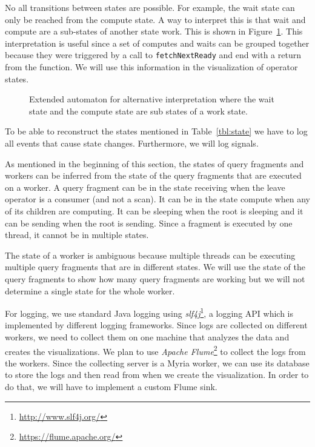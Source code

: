 \documentclass[11pt]{article}
\begin{document}
No all transitions between states are possible. For example, the wait state can only be reached from the compute state. A way to interpret this is that wait and compute are a sub-states of another state work. This is shown in Figure~\ref{fig:extd_compute}. This interpretation is useful since a set of computes and waits can be grouped together because they were triggered by a call to \texttt{fetchNextReady} and end with a return from the function. We will use this information in the visualization of operator states.

\begin{figure}[h]
  \begin{center}
    \def\svgwidth{0.35\columnwidth}
    
  \end{center}
  \caption{Extended automaton for alternative interpretation where the wait state and the compute state are sub states of a work state.}
  \label{fig:extd_compute}
\end{figure}

To be able to reconstruct the states mentioned in Table~\ref{tbl:state} we have to log all events that cause state changes. Furthermore, we will log signals. %

As mentioned in the beginning of this section, the states of query fragments and workers can be inferred from the state of the query fragments that are executed on a worker. A query fragment can be in the state receiving when the leave operator is a consumer (and not a scan). It can be in the state compute when any of its children are computing. It can be sleeping when the root is sleeping and it can be sending when the root is sending. Since a fragment is executed by one thread, it cannot be in multiple states.

The state of a worker is ambiguous because multiple threads can be executing multiple query fragments that are in different states. We will use the state of the query fragments to show how many query fragments are working but we will not determine a single state for the whole worker.


For logging, we use standard Java logging using \emph{slf4j}\footnote{\url{http://www.slf4j.org/}}, a logging API which is implemented by different logging frameworks. Since logs are collected on different workers, we need to collect them on one machine that analyzes the data and creates the visualizations. We plan to use \emph{Apache Flume}\footnote{\url{https://flume.apache.org/}} to collect the logs from the workers. Since the collecting server is a Myria worker, we can use its database to store the logs and then read from when we create the visualization. In order to do that, we will have to implement a custom Flume sink.
\end{document}

